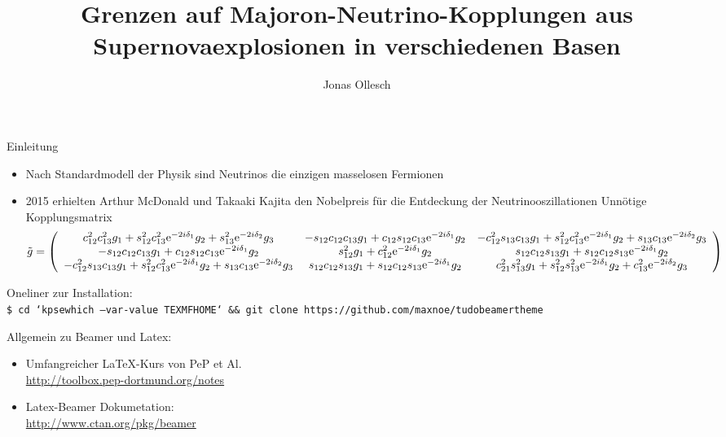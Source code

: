 \documentclass[aspectratio=1610, 9pt]{beamer}
\title{Grenzen auf Majoron-Neutrino-Kopplungen aus Supernovaexplosionen in verschiedenen Basen}
\author[J.~Ollesch]{Jonas Ollesch}
\institute[AG Päs]{Arbeitsgruppe Päs \\  Fakultät Physik}
\begin{document}
\maketitle

\begin{frame}{Einleitung}
  \begin{itemize}
    \item Nach Standardmodell der Physik sind Neutrinos die einzigen masselosen Fermionen
    \item 2015 erhielten Arthur McDonald und Takaaki Kajita den Nobelpreis für die Entdeckung der Neutrinooszillationen
    Unnötige Kopplungsmatrix
    \begin{equation}
      \tilde{g} = \left( \begin{array}{c c c}
        c^2_{1 2} c^2_{1 3} g_1 + s^2_{12} c^2_{13} \mathrm{e}^{-2 i \delta_1} g_2 + s^2_{13} \mathrm{e}^{-2 i \delta_2}  g_3               &   -s_{12}c_{12}c_{13} g_1 + c_{12} s_{12} c_{13} \mathrm{e}^{-2 i \delta_1} g_2       &   -c^2_{12} s_{13} c_{13} g_1 + s^2_{12} c^2_{13} \mathrm{e}^{-2 i \delta_1} g_2 + s_{13} c_{13} \mathrm{e}^{-2 i \delta_2} g_3  \\ 
        -s_{12}c_{12}c_{13} g_1 + c_{12} s_{12} c_{13} \mathrm{e}^{-2 i \delta_1} g_2                                                       &   s^2_{12} g_1 + c^2_{12} \mathrm{e}^{-2 i \delta_1} g_2                              &   s_{12} c_{12} s_{13} g_1 + s_{12}c_{12}s_{13} \mathrm{e}^{-2 i \delta_1} g_2   \\ 
        -c^2_{12} s_{13} c_{13} g_1 + s^2_{12} c^2_{13} \mathrm{e}^{-2 i \delta_1} g_2 + s_{13} c_{13} \mathrm{e}^{-2 i \delta_2} g_3       &   s_{12} c_{12} s_{13} g_1 + s_{12}c_{12}s_{13} \mathrm{e}^{-2 i \delta_1} g_2        &   c^2_{21} s^2_{13} g_1 + s^2_{12}s^2_{13} \mathrm{e}^{-2 i \delta_1} g_2 + c^2_{13} \mathrm{e}^{-2 i \delta_2} g_3  \\
    \end{array}\right)  
    \end{equation}
      \end{itemize}

  Oneliner zur Installation:\\
  \texttt{\footnotesize\$ cd `kpsewhich --var-value TEXMFHOME` \&\& git clone https://github.com/maxnoe/tudobeamertheme}

  \medskip
  Allgemein zu Beamer und Latex:
  \begin{itemize}
    \item Umfangreicher \LaTeX-Kurs von PeP et Al. \\
      \url{http://toolbox.pep-dortmund.org/notes}
    \item Latex-Beamer Dokumetation:\\
    \url{http://www.ctan.org/pkg/beamer}
  \end{itemize}
\end{frame}
\end{document}
